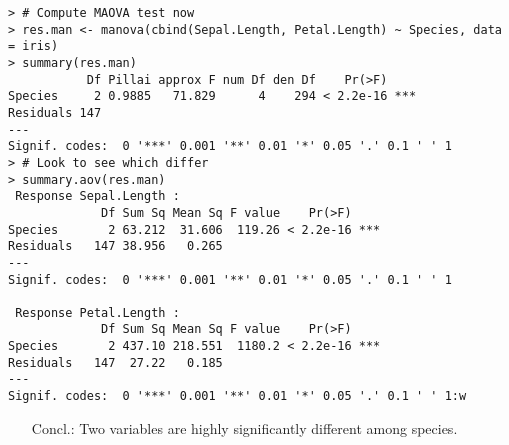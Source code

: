 \begin{frame}[fragile]
\begin{center}
\begin{minipage}{0.9\textwidth}
\begin{lstlisting}
> # Compute MAOVA test now
> res.man <- manova(cbind(Sepal.Length, Petal.Length) ~ Species, data = iris)
> summary(res.man)
           Df Pillai approx F num Df den Df    Pr(>F)
Species     2 0.9885   71.829      4    294 < 2.2e-16 ***
Residuals 147
---
Signif. codes:  0 '***' 0.001 '**' 0.01 '*' 0.05 '.' 0.1 ' ' 1
> # Look to see which differ
> summary.aov(res.man)
 Response Sepal.Length :
             Df Sum Sq Mean Sq F value    Pr(>F)
Species       2 63.212  31.606  119.26 < 2.2e-16 ***
Residuals   147 38.956   0.265
---
Signif. codes:  0 '***' 0.001 '**' 0.01 '*' 0.05 '.' 0.1 ' ' 1

 Response Petal.Length :
             Df Sum Sq Mean Sq F value    Pr(>F)
Species       2 437.10 218.551  1180.2 < 2.2e-16 ***
Residuals   147  27.22   0.185
---
Signif. codes:  0 '***' 0.001 '**' 0.01 '*' 0.05 '.' 0.1 ' ' 1:w
\end{lstlisting}
\end{minipage}
\end{center}
\vfill

\begin{enumerate}
\item[Concl.:] Two variables are highly significantly different among species.
\end{enumerate}
\end{frame}
